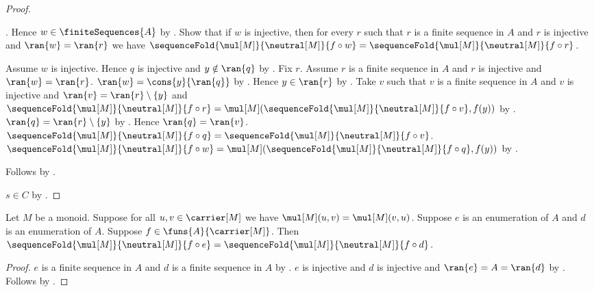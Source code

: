 \begin{proof}
\begin{subproof}
            .
        Hence $w\in\finiteSequences{A}$ by
            .
        Show that if $w$ is injective, then for every $r$ such that
            $r$ is a finite sequence in $A$ and
            $r$ is injective and $\ran{w}=\ran{r}$ we have
            $\sequenceFold{\mul[M]}{\neutral[M]}{f\circ w}
                =\sequenceFold{\mul[M]}{\neutral[M]}{f\circ r}$.
        \begin{subproof}
            Assume $w$ is injective.
            Hence $q$ is injective and $y\notin\ran{q}$ by
                .
            Fix $r$.
            Assume $r$ is a finite sequence in $A$ and
                $r$ is injective and $\ran{w}=\ran{r}$.
            $\ran{w}=\cons{y}{\ran{q}}$ by
                .
            Hence $y\in\ran{r}$ by .
            Take $v$ such that
                $v$ is a finite sequence in $A$ and
                $v$ is injective and
                $\ran{v}=\ran{r}\setminus\{y\}$ and
                $\sequenceFold{\mul[M]}{\neutral[M]}{f\circ r}
                    =\mul[M]
                        (\sequenceFold{\mul[M]}{\neutral[M]}{f\circ v},
                         f(y))$ by
                .
            $\ran{q}=\ran{r}\setminus\{y\}$ by
                .
            Hence $\ran{q}=\ran{v}$.
            $\sequenceFold{\mul[M]}{\neutral[M]}{f\circ q}
                =\sequenceFold{\mul[M]}{\neutral[M]}{f\circ v}$.
            $\sequenceFold{\mul[M]}{\neutral[M]}{f\circ w}
                =\mul[M]
                    (\sequenceFold{\mul[M]}{\neutral[M]}{f\circ q},
                     f(y))$ by
                .
        \end{subproof}
        Follows by \auto.
    \end{subproof}
    $s\in C$ by .
\end{proof}

\begin{corollary}\label{monoid_enumeration_fold_invariant}
    Let $M$ be a monoid.
    Suppose for all $u,v\in\carrier[M]$ we have
        $\mul[M](u,v)=\mul[M](v,u)$.
    Suppose $e$ is an enumeration of $A$ and
        $d$ is an enumeration of $A$.
    Suppose $f\in\funs{A}{\carrier[M]}$.
    Then
        $\sequenceFold{\mul[M]}{\neutral[M]}{f\circ e}
            =\sequenceFold{\mul[M]}{\neutral[M]}{f\circ d}$.
\end{corollary}
\begin{proof}
    $e$ is a finite sequence in $A$ and
        $d$ is a finite sequence in $A$ by
        .
    $e$ is injective and $d$ is injective and
        $\ran{e}=A=\ran{d}$ by
        .
    Follows by .
\end{proof}

